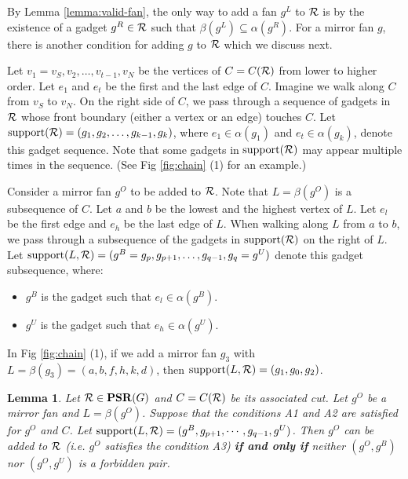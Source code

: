 \documentclass[11pt]{article}
\newcommand{\R}{{\cal R}}
\newcommand{\PSR}{\mathbf{PSR}}
\newtheorem{lemma}[figure]{Lemma}
\begin{document}
By Lemma \ref{lemma:valid-fan}, the only way to add a fan $g^L$ to $\R$
is by the existence of a gadget $g^R \in \R$ such that $\beta(g^L)
\subseteq \alpha(g^R)$. For a mirror fan $g$, there is another
condition for adding $g$ to $\R$ which we discuss next.

Let $v_1=v_S,v_2, \ldots, v_{t-1},v_N$ be the vertices of $C=C(\R)$ from lower
to higher order. Let $e_1$ and $e_t$ be the first and the last edge of $C$.
Imagine we walk along $C$ from $v_S$ to $v_N$. On the right
side of $C$, we pass through a sequence of gadgets in $\R$ whose front
boundary (either a vertex or an edge) touches $C$. Let
$\mbox{support}(\R)=(g_1,g_2,\ldots,g_{k-1},g_k)$,
where $e_1 \in \alpha(g_1)$ and $e_t \in \alpha(g_k)$,
denote this gadget sequence. Note that some gadgets in
$\mbox{support}(\R)$ may appear multiple times in the sequence.
(See Fig \ref{fig:chain} (1) for an example.)

Consider a mirror fan $g^O$ to be added to $\R$. Note that $L=\beta(g^O)$
is a subsequence of $C$. Let $a$ and $b$ be the lowest and the highest vertex
of $L$. Let $e_l$ be the first edge and $e_h$ be the last edge of $L$. When walking
along $L$ from $a$ to $b$, we pass through a subsequence
of the gadgets in $\mbox{support}(\R)$ on the right of $L$.
Let $\mbox{support}(L, \R) =(g^B=g_p, g_{p+1},\ldots, g_{q-1},g_q=g^U)$
denote this gadget subsequence, where:

\begin{itemize}
\item $g^B$ is the gadget such that $e_l \in \alpha(g^B)$.
\item $g^U$ is the gadget such that $e_h \in \alpha(g^U)$.
\end{itemize}

In Fig \ref{fig:chain} (1), if we add a mirror fan $g_{3}$ with
$L=\beta(g_{3})=(a, b, f, h, k, d)$, then $\mbox{support}(L,\R)
=(g_1, g_0, g_2)$.


\begin{lemma}\label{lemma:mirror-fan}
Let $\R\in \PSR(G)$ and $C = C(\R)$ be its associated cut.
Let $g^O$ be a mirror fan and $L=\beta(g^O)$. Suppose that the conditions
A1 and A2 are satisfied for $g^O$ and $C$. Let
$\mbox{support}(L, \R)=(g^B, g_{p+1}, \cdots, g_{q-1}, g^U)$.
Then $g^O$ can be added to $\R$ (i.e. $g^O$ satisfies the condition A3)
{\bf if and only if} neither $(g^O, g^B)$ nor $(g^O, g^U)$ is a forbidden pair.
\end{lemma}
\end{document}
